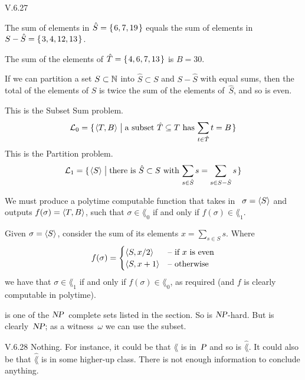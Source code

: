%
\begin{ans}{V.6.27}
\begin{exparts}
\item The sum of elements in $\hat{S}=\set{6,7,19}$ equals the sum
  of elements in $S-\hat{S}=\set{3,4,12,13}$.
\item The sum of the elements of $\hat{T}=\set{4,6,7,13}$ is $B=30$.
\item If we can partition a set $S\subset\N$ into
$\hat{S}\subset S$ and $S-\hat{S}$
with equal sums, then the total of the elements of $S$ is twice the sum
of the elements of~$\hat{S}$, and so is even.
\item This is the Subset Sum problem.
\begin{equation*}
  \lang_0=\set{\sequence{T,B}\suchthat
            \text{a subset~$\hat{T}\subseteq T$ has $\sum_{t\in\hat{T}}t=B$}}
\end{equation*}
This is the Partition problem.
\begin{equation*}
  \lang_1=\set{\sequence{S}\suchthat
                \text{there is $\hat{S}\subset S$ with $\sum_{s\in\hat{S}}s=\sum_{s\in S-\hat{S}}s$}}
\end{equation*}
\item We must produce a
polytime computable function that
takes in ~$\sigma=\sequence{S}$
and outputs $f(\sigma)=\sequence{T,B}$, such that
$\sigma\in\lang_0$ if and only if $f(\sigma)\in\lang_1$.

Given $\sigma=\sequence{S}$, consider the sum of its elements
$x=\sum_{s\in S}s$.
Where
\begin{equation*}
  f(\sigma)=
  \begin{cases}
  \sequence{S,x/2}  &\case{if $x$ is even}   \\
  \sequence{S,x+1}  &\case{otherwise}
  \end{cases}
\end{equation*}
we have that $\sigma\in\lang_1$ if and only if $f(\sigma)\in\lang_0$, as
required (and $f$ is clearly computable in polytime).
\item {} is one of the $\NP$~complete sets listed in the
section.
So  is $\NP$-hard.
But  is clearly~$\NP$; as a witness~$\omega$ we can use
the subset.
\end{exparts}
\end{ans}
%
\begin{ans}{V.6.28}
Nothing.
For instance, it could be that $\lang$ is in~$\P$ and so is $\hat{\lang}$.
It could also be that $\hat{\lang}$ is in some higher-up class.
There is not enough information to conclude anything.
\end{ans}
